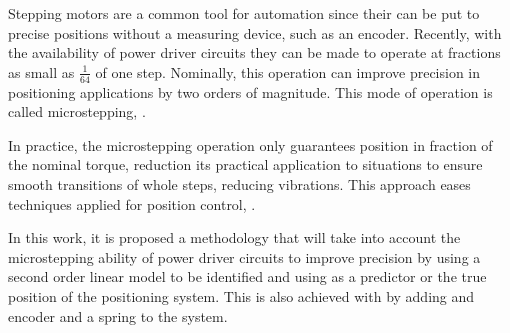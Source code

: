 \documentclass[journal]{IEEEtran}
\begin{document}
Stepping motors are a common tool for automation since their can be put to precise positions without a measuring device, such as an encoder. Recently, with the availability of power driver circuits they can be made to operate at fractions as small as $\frac{1}{64}$ of one step. Nominally, this operation can improve precision in positioning applications by two orders of magnitude. This mode of operation is called microstepping, \cite{Kim2013,Kim2013a,Chen2010,Baluta2007}.

In practice, the microstepping operation only guarantees position in fraction of the nominal torque, reduction its practical application to situations to ensure smooth transitions of whole steps, reducing vibrations. This approach eases techniques applied for position control, \cite{Bellini2007,Li2009,Defoort2009,Bendjedia2012,Chen2010}.

In this work, it is proposed a methodology that will take into account the microstepping ability of power driver circuits to improve precision by using a second order linear model to be identified and using as a predictor or the true position of the positioning system. This is also achieved with by adding and encoder and a spring to the system.




%
%

\end{document}
